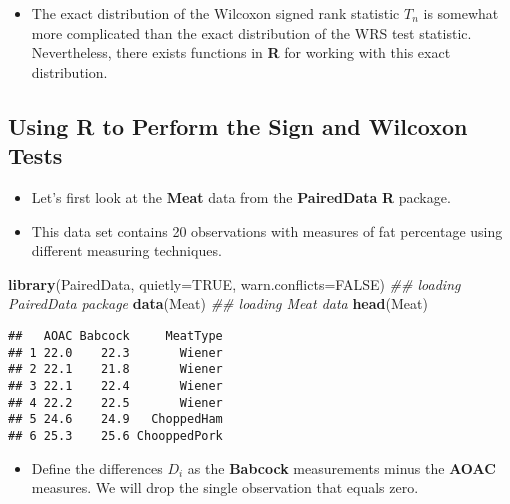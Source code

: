 \documentclass[]{book}
\newenvironment{Shaded}{\begin{snugshade}}{\end{snugshade}}
\newcommand{\CommentTok}[1]{\textcolor[rgb]{0.56,0.35,0.01}{\textit{#1}}}
\newcommand{\DataTypeTok}[1]{\textcolor[rgb]{0.13,0.29,0.53}{#1}}
\newcommand{\KeywordTok}[1]{\textcolor[rgb]{0.13,0.29,0.53}{\textbf{#1}}}
\newcommand{\NormalTok}[1]{#1}
\newcommand{\OtherTok}[1]{\textcolor[rgb]{0.56,0.35,0.01}{#1}}
\providecommand{\tightlist}{%
  \setlength{\itemsep}{0pt}\setlength{\parskip}{0pt}}
\begin{document}
\begin{itemize}
\tightlist
\item
  The exact distribution of the Wilcoxon signed rank statistic \(T_{n}\)
  is somewhat more complicated than the exact distribution of the WRS test statistic.
  Nevertheless, there exists functions in \textbf{R} for working with this exact distribution.
\end{itemize}

\hypertarget{using-r-to-perform-the-sign-and-wilcoxon-tests}{%
\subsection{Using R to Perform the Sign and Wilcoxon Tests}\label{using-r-to-perform-the-sign-and-wilcoxon-tests}}

\begin{itemize}
\item
  Let's first look at the \textbf{Meat} data from the \textbf{PairedData} \textbf{R} package.
\item
  This data set contains 20 observations with measures of fat percentage using different
  measuring techniques.
\end{itemize}

\begin{Shaded}
\begin{Highlighting}[]
\KeywordTok{library}\NormalTok{(PairedData, }\DataTypeTok{quietly=}\OtherTok{TRUE}\NormalTok{, }\DataTypeTok{warn.conflicts=}\OtherTok{FALSE}\NormalTok{) }\CommentTok{## loading PairedData package}
\KeywordTok{data}\NormalTok{(Meat)  }\CommentTok{## loading Meat data}
\KeywordTok{head}\NormalTok{(Meat)}
\end{Highlighting}
\end{Shaded}

\begin{verbatim}
##   AOAC Babcock     MeatType
## 1 22.0    22.3       Wiener
## 2 22.1    21.8       Wiener
## 3 22.1    22.4       Wiener
## 4 22.2    22.5       Wiener
## 5 24.6    24.9   ChoppedHam
## 6 25.3    25.6 ChooppedPork
\end{verbatim}

\begin{itemize}
\tightlist
\item
  Define the differences \(D_{i}\) as the \textbf{Babcock} measurements minus the \textbf{AOAC} measures.
  We will drop the single observation that equals zero.
\end{itemize}
\end{document}
